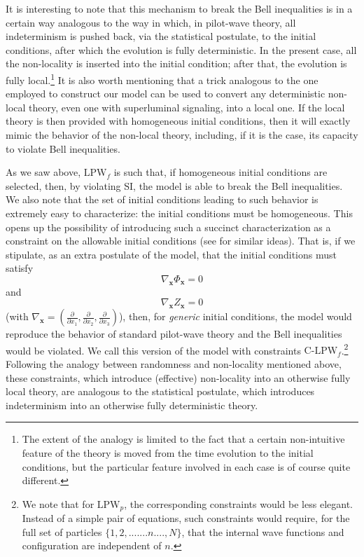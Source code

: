 \documentclass[letterpaper,12pt]{article}
\begin{document}
It is interesting to note that this mechanism to break the Bell inequalities is in a certain way analogous to the way in which, in pilot-wave theory, all indeterminism is pushed back, via the statistical postulate, to the initial conditions, after which the evolution is fully deterministic. In the present case, all the non-locality is inserted into the initial condition; after that, the evolution is fully local.\footnote{The extent of the analogy is limited to the fact that a certain non-intuitive feature of the theory is moved from the time evolution to the initial conditions, but the particular feature involved in each case is of course quite different.} It is also worth mentioning that a trick analogous to the one employed to construct our model can be used to convert any deterministic non-local theory, even one with superluminal signaling, into a local one. If the local theory is then provided with homogeneous initial conditions, then it will exactly mimic the behavior of the non-local theory, including, if it is the case, its capacity to violate Bell inequalities.

As we saw above, $\text{LPW}_f$ is such that, if homogeneous initial conditions are selected, then, by violating SI, the model is able to break the Bell inequalities. We also note that the set of initial conditions leading to such behavior is extremely easy to characterize: the initial conditions must be homogeneous. This opens up the possibility of introducing such a succinct characterization as a constraint on the allowable initial conditions (see \cite{Weinstein} for similar ideas). That is, if we stipulate, as an extra postulate of the model, that the initial conditions must satisfy
\begin{equation}\label{Hom1}
\nabla_\mathbf{x} \Phi_\mathbf{x} = 0 
\end{equation}
and
\begin{equation}\label{Hom2}
\nabla_\mathbf{x} Z_\mathbf{x} = 0
\end{equation}
(with $\nabla_\mathbf{x} = \left( \frac{\partial}{\partial x_1},\frac{\partial}{\partial x_2},\frac{\partial}{\partial x_3}\right)$), then, for \emph{generic} initial conditions, the model would reproduce the behavior of standard pilot-wave theory and the Bell inequalities would be violated. We call this version of the model with constraints $\text{C-LPW}_f$.\footnote{We note that for $\text{LPW}_p$, the corresponding constraints would be less elegant. Instead of a simple pair of equations, such constraints would require, for the full set of particles $\lbrace 1, 2, ....... n...., N\rbrace $, that the internal wave functions and configuration are independent of $n$.} Following the analogy between randomness and non-locality mentioned above, these constraints, which introduce (effective) non-locality into an otherwise fully local theory, are analogous to the statistical postulate, which introduces indeterminism into an otherwise fully deterministic theory. 
 
\end{document}
